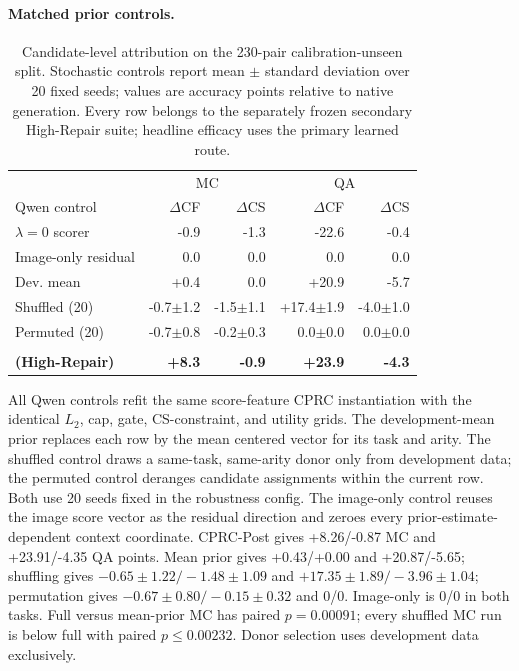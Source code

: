 \documentclass[letterpaper]{article}
\begin{document}
\paragraph{Matched prior controls.}
\begin{table}[t]
\centering
\small
\setlength{\tabcolsep}{2.3pt}
\begin{tabular}{lrrrr}
\toprule
 & \multicolumn{2}{c}{MC} & \multicolumn{2}{c}{QA} \\
Qwen control & $\Delta$CF & $\Delta$CS & $\Delta$CF & $\Delta$CS \\
\midrule
$\lambda=0$ scorer & -0.9 & -1.3 & -22.6 & -0.4 \\
Image-only residual & 0.0 & 0.0 & 0.0 & 0.0 \\
Dev. mean & +0.4 & 0.0 & +20.9 & -5.7 \\
Shuffled (20) & -0.7$\pm$1.2 & -1.5$\pm$1.1 & +17.4$\pm$1.9 & -4.0$\pm$1.0 \\
Permuted (20) & -0.7$\pm$0.8 & -0.2$\pm$0.3 & 0.0$\pm$0.0 & 0.0$\pm$0.0 \\
\shortstack[l]{\textbf{CPRC-Post}\\\textbf{(High-Repair)}} &
\textbf{+8.3} & \textbf{-0.9} & \textbf{+23.9} & \textbf{-4.3} \\
\bottomrule
\end{tabular}
\caption{Candidate-level attribution on the 230-pair calibration-unseen split.
Stochastic controls report mean $\pm$ standard deviation over 20 fixed seeds;
values are accuracy points relative to native generation. Every row belongs to
the separately frozen secondary High-Repair suite; headline efficacy uses
the primary learned route.}
\label{tab:supp-attribution}
\end{table}

All Qwen controls refit the same score-feature CPRC instantiation with the identical
$L_2$, cap, gate, CS-constraint, and utility grids. The development-mean prior
replaces each row by the mean centered vector for its task and arity. The
shuffled control draws a same-task, same-arity donor only from development data;
the permuted control deranges candidate assignments within the current row.
Both use 20 seeds fixed in the robustness config. The image-only control reuses
the image score vector as the residual direction and zeroes every
prior-estimate-dependent context coordinate. CPRC-Post gives +8.26/-0.87 MC and
+23.91/-4.35 QA points. Mean prior gives +0.43/+0.00 and +20.87/-5.65;
shuffling gives $-0.65\pm1.22/-1.48\pm1.09$ and
$+17.35\pm1.89/-3.96\pm1.04$; permutation gives
$-0.67\pm0.80/-0.15\pm0.32$ and 0/0. Image-only is 0/0 in both tasks. Full
versus mean-prior MC has paired $p=0.00091$; every shuffled MC run is below full
with paired $p\leq0.00232$. Donor selection uses development data exclusively.
\end{document}
